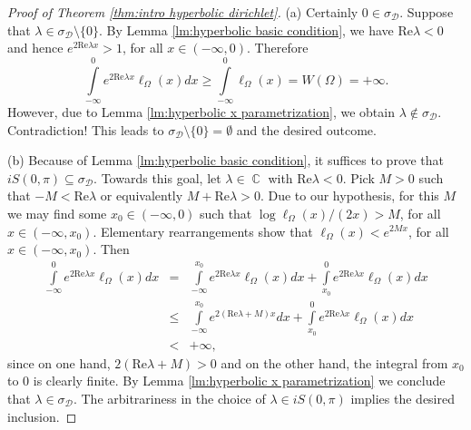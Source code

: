 \documentclass[11pt]{amsart}
\numberwithin{equation}{section}
\theoremstyle{definition}
\DeclareMathOperator{\C}{\mathbb{C}}
\begin{document}
	\begin{proof}[Proof of Theorem \ref{thm:intro hyperbolic dirichlet}]
		(a) Certainly $0\in\sigma_{\mathcal{D}}$. Suppose that $\lambda\in\sigma_{\mathcal{D}}\setminus\{0\}$. By Lemma \ref{lm:hyperbolic basic condition}, we have $\mathrm{Re}\lambda<0$ and hence $e^{2\mathrm{Re}\lambda x}>1$, for all $x\in(-\infty,0)$. Therefore
		$$\int\limits_{-\infty}^{0}e^{2\mathrm{Re}\lambda x}\ell_\Omega(x)dx\ge\int\limits_{-\infty}^{0}\ell_\Omega(x)=W(\Omega)=+\infty.$$
		However, due to Lemma \ref{lm:hyperbolic x parametrization}, we obtain $\lambda\notin\sigma_{\mathcal{D}}$. Contradiction! This leads to $\sigma_{\mathcal{D}}\setminus\{0\}=\emptyset$ and the desired outcome.
		
		(b) Because of Lemma \ref{lm:hyperbolic basic condition}, it suffices to prove that $iS(0,\pi)\subseteq\sigma_{\mathcal{D}}$. Towards this goal, let $\lambda\in\C$ with $\mathrm{Re}\lambda<0$. Pick $M>0$ such that $-M<\mathrm{Re}\lambda$ or equivalently $M+\mathrm{Re}\lambda>0$. Due to our hypothesis, for this $M$ we may find some $x_0\in(-\infty,0)$ such that $\log\ell_\Omega(x)/(2x)>M$, for all $x\in(-\infty,x_0)$. Elementary rearrangements show that $\ell_\Omega(x)<e^{2Mx}$, for all $x\in(-\infty,x_0)$. Then
		\begin{eqnarray*}
			\int\limits_{-\infty}^{0}e^{2\mathrm{Re}\lambda x}\ell_\Omega(x)dx &=& \int\limits_{-\infty}^{x_0}e^{2\mathrm{Re}\lambda x}\ell_\Omega(x)dx+\int\limits_{x_0}^{0}e^{2\mathrm{Re}\lambda x}\ell_\Omega(x)dx \\
			&\le&\int\limits_{-\infty}^{x_0}e^{2(\mathrm{Re}\lambda+M)x}dx+\int\limits_{x_0}^{0}e^{2\mathrm{Re}\lambda x}\ell_\Omega(x)dx\\
			&<&+\infty,
		\end{eqnarray*}
		since on one hand, $2(\mathrm{Re}\lambda+M)>0$ and on the other hand, the integral from $x_0$ to $0$ is clearly finite. By Lemma \ref{lm:hyperbolic x parametrization} we conclude that $\lambda\in\sigma_{\mathcal{D}}$. The arbitrariness in the choice of $\lambda\in iS(0,\pi)$ implies the desired inclusion.
		

\end{proof}
\end{document}
